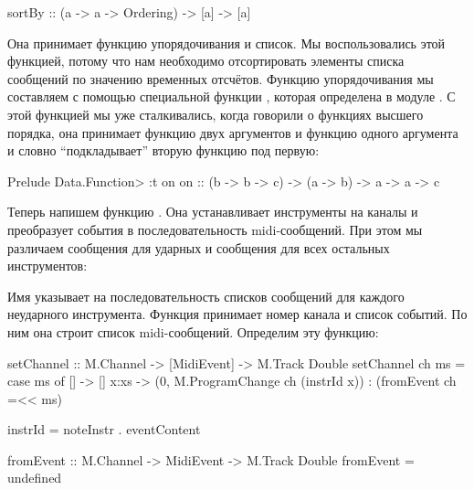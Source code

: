 \begin{code}
sortBy :: (a -> a -> Ordering) -> [a] -> [a]
\end{code}

Она принимает функцию упорядочивания и список. Мы воспользовались этой
функцией, потому что нам необходимо отсортировать элементы списка
сообщений по значению временных отсчётов. Функцию упорядочивания мы
составляем с помощью специальной функции , которая определена в
модуле . С этой функцией мы уже сталкивались, когда
говорили о функциях высшего порядка, она принимает функцию двух
аргументов и функцию одного аргумента и словно ``подкладывает'' вторую
функцию под первую:


\begin{code}
Prelude Data.Function> :t on
on :: (b -> b -> c) -> (a -> b) -> a -> a -> c
\end{code}

Теперь напишем функцию . Она устанавливает инструменты на
каналы и преобразует события в последовательность midi-сообщений. При
этом мы различаем сообщения для ударных и сообщения для всех остальных
инструментов:



Имя  указывает на последовательность списков сообщений для
каждого неударного инструмента. Функция  принимает номер
канала и список событий. По ним она строит список midi-сообщений.
Определим эту функцию:


\begin{code}
setChannel :: M.Channel -> [MidiEvent] -> M.Track Double
setChannel ch ms = case ms of
    []      -> []
    x:xs    -> (0, M.ProgramChange ch (instrId x)) : (fromEvent ch =<< ms)
    
instrId = noteInstr . eventContent

fromEvent :: M.Channel -> MidiEvent -> M.Track Double
fromEvent = undefined
\end{code}

